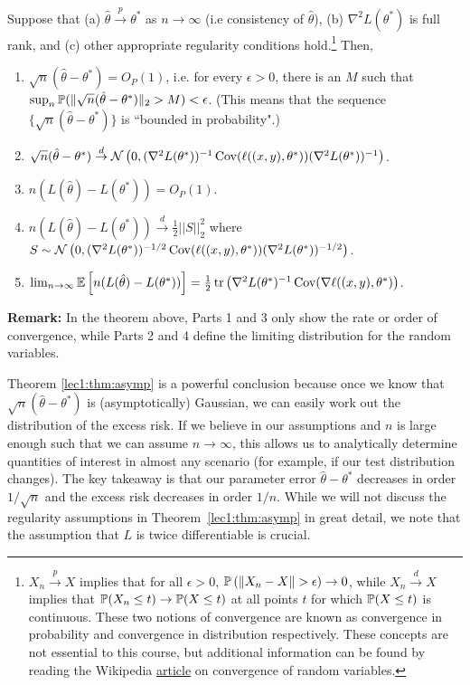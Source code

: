 \begin{theorem}
Suppose that (a) $\hat{\theta}  \overset{p}{\to} \theta^{*}$ as $n \to \infty$ (i.e consistency of $\hat{\theta}$), (b) $\nabla^{2}L(\theta^{*})$ is full rank, and  (c) other appropriate regularity conditions hold.\footnote{$X_n \overset{p}{\to} X$ implies that for all $\epsilon > 0$, $\mathbb P \left (\|X_n - X\| > \epsilon \right ) \to 0$, while $X_n \overset{d}{\to} X$ implies that $\mathbb P(X_n \leq t) \to \mathbb P(X \leq t)$ at all points $t$ for which $\mathbb P(X \leq t)$ is continuous. These two notions of convergence are known as convergence in probability and convergence in distribution respectively. These concepts are not essential to this course, but additional information can be found by reading the Wikipedia \href{https://en.wikipedia.org/wiki/Convergence_of_random_variables}{article} on convergence of random variables.} 
Then,
\begin{enumerate}
    \item $\sqrt{n} (\hat{\theta} - \theta^{*}) = O_P(1)$, i.e. for every $\epsilon > 0$, there is an $M$ such that $\sup_n \mathbb P (\| \sqrt{n} (\hat{\theta} - \theta^{*}) \|_2 > M) < \epsilon$. (This means that the sequence $\{ \sqrt{n} (\hat{\theta} - \theta^{*}) \}$ is ``bounded in probability".)
    
    \item  $\sqrt{n}(\hat{\theta}-\theta^{*}) \overset{d}{\to} \mathcal{N} \left(0, (\nabla^{2}L(\theta^{*}))^{-1}\operatorname{Cov}(\ell((x,y), \theta^*)) (\nabla^{2}L(\theta^{*}))^{-1} \right)$.
     \item $n (L(\hat{\theta}) - L(\theta^{*})) = O_P(1)$.
    \item $n (L(\hat{\theta}) - L(\theta^{*})) \overset{d}{\to} \frac{1}{2} ||S||_{2}^{2}$ where $S \sim \mathcal{N} \left(0, (\nabla^{2}L(\theta^{*}))^{-1/2}\operatorname{Cov}(\ell((x,y), \theta^*)) (\nabla^{2}L(\theta^{*}))^{-1/2} \right)$.
    \item $\lim_{n \to \infty} \mathbb{E} \left[ n (L(\hat \theta) - L(\theta^*)) \right] = \frac12 \operatorname{tr}\left( \nabla^2 L(\theta^*)^{-1} \operatorname{Cov}(\nabla \ell ((x, y), \theta^*) \right)$.
\end{enumerate}
\label{lec1:thm:asymp}
\end{theorem}
\textbf{Remark:} In the theorem above, Parts 1 and 3 only show the rate or order of convergence, while Parts 2 and 4 define the limiting distribution for the random variables.

Theorem \ref{lec1:thm:asymp} is a powerful conclusion because once we know that $\sqrt{n}(\hat \theta  - \theta^*)$ is (asymptotically) Gaussian, we can easily work out the distribution of the excess risk. If we believe in our assumptions and $n$ is large enough such that we can assume $n \to \infty$, this allows us to analytically determine quantities of interest in almost any scenario (for example, if our test distribution changes). The key takeaway is that our parameter error $\hat{\theta} - \theta^*$ decreases in order $1/\sqrt{n}$ and the excess risk decreases in order $1/n$. While we will not discuss the regularity assumptions in Theorem~\ref{lec1:thm:asymp} in great detail, we note that the assumption that $L$ is twice differentiable is crucial. 

